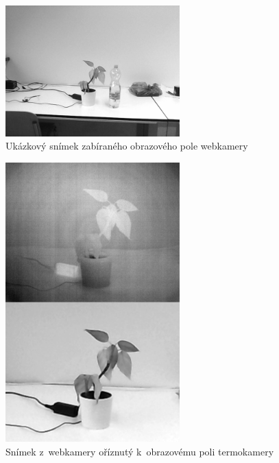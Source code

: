     \begin{figure}[h]
      \centering
      \includegraphics[width=0.6\textwidth]{images/webcam_sample.png}
      \caption{Ukázkový snímek zabíraného obrazového pole webkamery}
      \label{fig:webcam_sample}
    \end{figure} 

    \begin{figure}[h]
      \centering
      \includegraphics[width=0.6\textwidth]{images/visible_cropped_to_thermal.png}
      \caption{Snímek z~webkamery oříznutý k~obrazovému poli termokamery}
      \label{fig:visible_cropped_to_thermal}
    \end{figure} 

